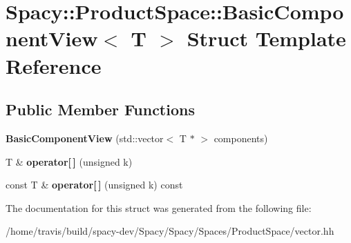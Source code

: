 \hypertarget{structSpacy_1_1ProductSpace_1_1BasicComponentView}{\section{Spacy\-:\-:Product\-Space\-:\-:Basic\-Component\-View$<$ T $>$ Struct Template Reference}
\label{structSpacy_1_1ProductSpace_1_1BasicComponentView}
}
\subsection*{Public Member Functions}
\begin{DoxyCompactItemize}
\item 
\hypertarget{structSpacy_1_1ProductSpace_1_1BasicComponentView_a00b63d0532ba0c10157f655cb010d66f}{{\bfseries Basic\-Component\-View} (std\-::vector$<$ T $\ast$ $>$ components)}\label{structSpacy_1_1ProductSpace_1_1BasicComponentView_a00b63d0532ba0c10157f655cb010d66f}

\item 
\hypertarget{structSpacy_1_1ProductSpace_1_1BasicComponentView_a4c95c8eb67ae959ddb718076760d96c5}{T \& {\bfseries operator\mbox{[}$\,$\mbox{]}} (unsigned k)}\label{structSpacy_1_1ProductSpace_1_1BasicComponentView_a4c95c8eb67ae959ddb718076760d96c5}

\item 
\hypertarget{structSpacy_1_1ProductSpace_1_1BasicComponentView_ac5b900dd6b8e445581c2b51c0242c95c}{const T \& {\bfseries operator\mbox{[}$\,$\mbox{]}} (unsigned k) const }\label{structSpacy_1_1ProductSpace_1_1BasicComponentView_ac5b900dd6b8e445581c2b51c0242c95c}

\end{DoxyCompactItemize}


The documentation for this struct was generated from the following file\-:\begin{DoxyCompactItemize}
\item 
/home/travis/build/spacy-\/dev/\-Spacy/\-Spacy/\-Spaces/\-Product\-Space/vector.\-hh\end{DoxyCompactItemize}

